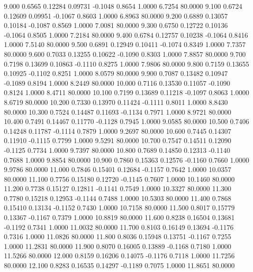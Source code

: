    9.000   0.6565   0.12284   0.09731  -0.1048   0.8654   1.0000   6.7254  80.0000
   9.100   0.6724   0.12609   0.09951  -0.1067   0.8603   1.0000   6.8963  80.0000
   9.200   0.6889   0.13057   0.10184  -0.1087   0.8569   1.0000   7.0081  80.0000
   9.300   0.6750   0.12722   0.10136  -0.1064   0.8505   1.0000   7.2184  80.0000
   9.400   0.6784   0.12757   0.10238  -0.1064   0.8416   1.0000   7.5140  80.0000
   9.500   0.6891   0.12949   0.10411  -0.1074   0.8349   1.0000   7.7357  80.0000
   9.600   0.7033   0.13255   0.10622  -0.1090   0.8303   1.0000   7.8857  80.0000
   9.700   0.7198   0.13699   0.10863  -0.1110   0.8275   1.0000   7.9806  80.0000
   9.800   0.7159   0.13655   0.10925  -0.1102   0.8251   1.0000   8.0579  80.0000
   9.900   0.7087   0.13482   0.10947  -0.1089   0.8194   1.0000   8.2449  80.0000
  10.000   0.7116   0.13530   0.11057  -0.1090   0.8124   1.0000   8.4711  80.0000
  10.100   0.7199   0.13689   0.11218  -0.1097   0.8063   1.0000   8.6719  80.0000
  10.200   0.7330   0.13970   0.11424  -0.1111   0.8011   1.0000   8.8430  80.0000
  10.300   0.7524   0.14487   0.11693  -0.1134   0.7971   1.0000   8.9721  80.0000
  10.400   0.7491   0.14467   0.11770  -0.1128   0.7945   1.0000   9.0585  80.0000
  10.500   0.7406   0.14248   0.11787  -0.1114   0.7879   1.0000   9.2697  80.0000
  10.600   0.7445   0.14307   0.11910  -0.1115   0.7799   1.0000   9.5291  80.0000
  10.700   0.7547   0.14511   0.12090  -0.1125   0.7734   1.0000   9.7397  80.0000
  10.800   0.7689   0.14850   0.12313  -0.1140   0.7688   1.0000   9.8854  80.0000
  10.900   0.7860   0.15363   0.12576  -0.1160   0.7660   1.0000   9.9786  80.0000
  11.000   0.7846   0.15401   0.12684  -0.1157   0.7642   1.0000  10.0357  80.0000
  11.100   0.7756   0.15180   0.12720  -0.1145   0.7607   1.0000  10.1460  80.0000
  11.200   0.7738   0.15127   0.12811  -0.1141   0.7549   1.0000  10.3327  80.0000
  11.300   0.7780   0.15218   0.12953  -0.1144   0.7488   1.0000  10.5303  80.0000
  11.400   0.7868   0.15410   0.13134  -0.1152   0.7430   1.0000  10.7158  80.0000
  11.500   0.8017   0.15779   0.13367  -0.1167   0.7379   1.0000  10.8819  80.0000
  11.600   0.8238   0.16504   0.13681  -0.1192   0.7341   1.0000  11.0032  80.0000
  11.700   0.8103   0.16149   0.13694  -0.1176   0.7316   1.0000  11.0826  80.0000
  11.800   0.8036   0.15948   0.13751  -0.1167   0.7255   1.0000  11.2831  80.0000
  11.900   0.8070   0.16005   0.13889  -0.1168   0.7180   1.0000  11.5266  80.0000
  12.000   0.8159   0.16206   0.14075  -0.1176   0.7118   1.0000  11.7256  80.0000
  12.100   0.8283   0.16535   0.14297  -0.1189   0.7075   1.0000  11.8651  80.0000
